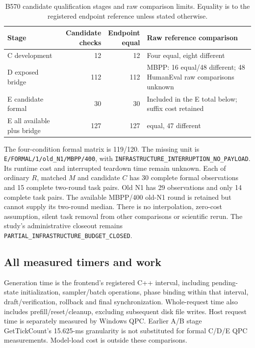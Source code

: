 \begin{table}[t]\centering\small
\caption{B570 candidate qualification stages and raw comparison limits. Equality is to the registered endpoint reference unless stated otherwise.}
\label{tab:b570_qualification}
\begin{tabularx}{\linewidth}{@{}>{\raggedright\arraybackslash}p{.25\linewidth}rr>{\raggedright\arraybackslash}X@{}}\toprule
Stage & \shortstack{Candidate\\checks} & \shortstack{Endpoint\\equal} & Raw reference comparison\\\midrule
C development & 12 & 12 & Four equal, eight different\\
D exposed bridge & 112 & 112 & MBPP: 16 equal/48 different; 48 HumanEval raw comparisons unknown\\
E candidate formal & 30 & 30 & Included in the E total below; suffix cost retained\\
E all available plus bridge & 127 & 127 & 80 equal, 47 different\\\bottomrule
\end{tabularx}
\end{table}

The four-condition formal matrix is 119/120. The missing unit is \nolinkurl{E/FORMAL/1/old_N1/MBPP/400}, with \nolinkurl{INFRASTRUCTURE_INTERRUPTION_NO_PAYLOAD}. Its runtime cost and interrupted teardown time remain unknown. Each of ordinary $R$, matched $M$ and candidate $C$ has 30 complete formal observations and 15 complete two-round task pairs. Old N1 has 29 observations and only 14 complete task pairs. The available MBPP/400 old-N1 round is retained but cannot supply its two-round median. There is no interpolation, zero-cost assumption, silent task removal from other comparisons or scientific rerun. The study's administrative closeout remains \nolinkurl{PARTIAL_INFRASTRUCTURE_BUDGET_CLOSED}.

\subsection{All measured timers and work}
\label{supp:b570_costs}
Generation time is the frontend's registered C++ interval, including pending-state initialization, sampler/batch operations, phase binding within that interval, draft/verification, rollback and final synchronization. Whole-request time also includes prefill/reset/cleanup, excluding subsequent disk file writes. Host request time is separately measured by Windows QPC. Earlier A/B stage GetTickCount's 15.625-ms granularity is not substituted for formal C/D/E QPC measurements. Model-load cost is outside these comparisons.

